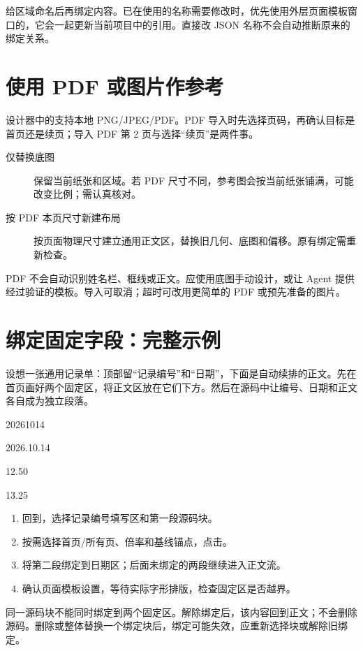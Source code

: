 给区域命名后再绑定内容。已在使用的名称需要修改时，优先使用外层页面模板窗口的，它会一起更新当前项目中的引用。直接改 JSON 名称不会自动推断原来的绑定关系。

\section{使用 PDF 或图片作参考}
设计器中的支持本地 PNG/JPEG/PDF。PDF 导入时先选择页码，再确认目标是首页还是续页；导入 PDF 第 2 页与选择“续页”是两件事。

\begin{description}
\item[仅替换底图] 保留当前纸张和区域。若 PDF 尺寸不同，参考图会按当前纸张铺满，可能改变比例；需认真核对。
\item[按 PDF 本页尺寸新建布局] 按页面物理尺寸建立通用正文区，替换旧几何、底图和偏移。原有绑定需重新检查。
\end{description}
PDF 不会自动识别姓名栏、框线或正文。应使用底图手动设计，或让 Agent 提供经过验证的模板。导入可取消；超时可改用更简单的 PDF 或预先准备的图片。

\section{绑定固定字段：完整示例}
设想一张通用记录单：顶部留“记录编号”和“日期”，下面是自动续排的正文。先在首页画好两个固定区，将正文区放在它们下方。然后在源码中让编号、日期和正文各自成为独立段落。
\par\noindent\begin{minipage}{\linewidth}
\begin{Source}
20261014

2026.10.14

12.50

13.25
\end{Source}
\end{minipage}\par\medskip
\begin{enumerate}
\item 回到，选择记录编号填写区和第一段源码块。
\item 按需选择首页/所有页、倍率和基线锚点，点击。
\item 将第二段绑定到日期区；后面未绑定的两段继续进入正文流。
\item 确认页面模板设置，等待实际字形排版，检查固定区是否越界。
\end{enumerate}
同一源码块不能同时绑定到两个固定区。解除绑定后，该内容回到正文；不会删除源码。删除或整体替换一个绑定块后，绑定可能失效，应重新选择块或解除旧绑定。

